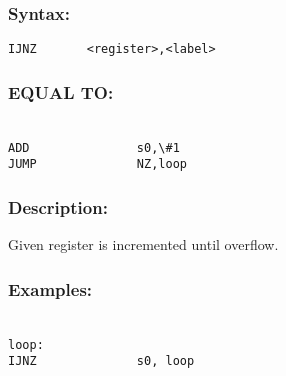 {        \subsubsection{Syntax:}
            \verb'IJNZ       <register>,<label>'

        \subsubsection{EQUAL TO:}
        {
            ~\\
            \usecodefont
            \verb'ADD               s0,\#1'\\
            \verb'JUMP              NZ,loop'\\
        }
        \subsubsection{Description:}
            Given register is incremented until overflow.

        \subsubsection{Examples:}
        {
            ~\\
            \usecodefont
            \verb'loop:             '\\
            \verb'IJNZ              s0, loop'\\
        }

}
